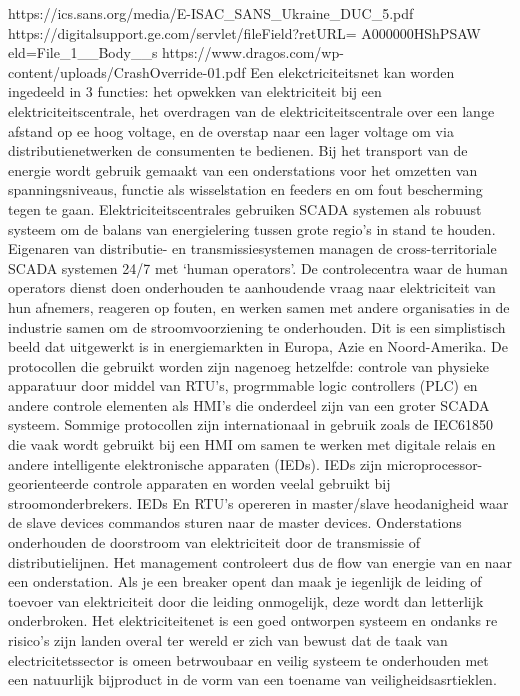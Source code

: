 {https://ics.sans.org/media/E-ISAC_SANS_Ukraine_DUC_5.pdf
https://digitalsupport.ge.com/servlet/fileField?retURL=%
A000000HShPSAW%
eld=File_1__Body__s
https://www.dragos.com/wp-content/uploads/CrashOverride-01.pdf
Een elekctriciteitsnet kan worden ingedeeld in 3 functies: het opwekken van elektriciteit bij een
elektriciteitscentrale, het overdragen van de elektriciteitscentrale over een lange afstand op ee hoog
voltage, en de overstap naar een lager voltage om via distributienetwerken de consumenten te
bedienen. Bij het transport van de energie wordt gebruik gemaakt van een onderstations voor het
omzetten van spanningsniveaus, functie als wisselstation en feeders en om fout bescherming tegen
te gaan.
Elektriciteitscentrales gebruiken SCADA systemen als robuust systeem om de balans van
energielering tussen grote regio’s in stand te houden. Eigenaren van distributie- en
transmissiesystemen managen de cross-territoriale SCADA systemen 24/7 met ‘human operators’.
De controlecentra waar de human operators dienst doen onderhouden te aanhoudende vraag naar
elektriciteit van hun afnemers, reageren op fouten, en werken samen met andere organisaties in de
industrie samen om de stroomvoorziening te onderhouden.
Dit is een simplistisch beeld dat uitgewerkt is in energiemarkten in Europa, Azie en Noord-Amerika.
De protocollen die gebruikt worden zijn nagenoeg hetzelfde: controle van physieke apparatuur door
middel van RTU’s, progrmmable logic controllers (PLC) en andere controle elementen als HMI’s die
onderdeel zijn van een groter SCADA systeem. Sommige protocollen zijn internationaal in gebruik
zoals de IEC61850 die vaak wordt gebruikt bij een HMI om samen te werken met digitale relais en
andere intelligente elektronische apparaten (IEDs). IEDs zijn microprocessor-georienteerde controle
apparaten en worden veelal gebruikt bij stroomonderbrekers. IEDs En RTU’s opereren in
master/slave heodanigheid waar de slave devices commandos sturen naar de master devices.
Onderstations onderhouden de doorstroom van elektriciteit door de transmissie of distributielijnen.
Het management controleert dus de flow van energie van en naar een onderstation. Als je een
breaker opent dan maak je iegenlijk de leiding of toevoer van elektriciteit door die leiding
onmogelijk, deze wordt dan letterlijk onderbroken.
Het elektriciteitenet is een goed ontworpen systeem en ondanks re risico’s zijn landen overal ter
wereld er zich van bewust dat de taak van electricitetssector is omeen betrwoubaar en veilig systeem
te onderhouden met een natuurlijk bijproduct in de vorm van een toename van veiligheidsasrtieklen.


}
